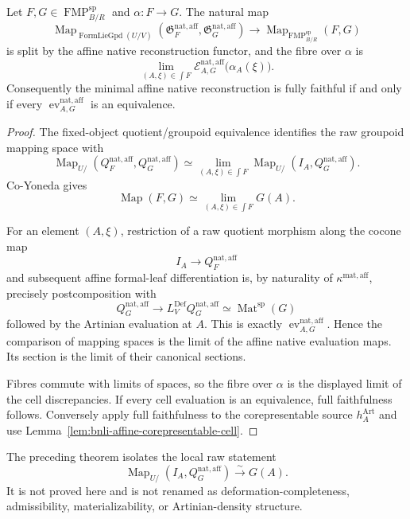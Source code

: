 \begin{theorem}
\label{thm:bnli-affine-mapping-discrepancy}
Let $F,G\in\operatorname{FMP}^{\mathrm{sp}}_{B/R}$ and
$\alpha:F\to G$.  The natural map
\[
    \operatorname{Map}_{\operatorname{FormLieGpd}(U/V)}
    (\mathfrak G_F^{\mathrm{nat,aff}},\mathfrak G_G^{\mathrm{nat,aff}})
    \longrightarrow
    \operatorname{Map}_{\operatorname{FMP}^{\mathrm{sp}}_{B/R}}(F,G)
\]
is split by the affine native reconstruction functor, and the fibre over
$\alpha$ is
\[
\boxed{
    \operatorname*{lim}_{(A,\xi)\in\int F}
    \mathscr E^{\mathrm{nat,aff}}_{A,G}
    \bigl(\alpha_A(\xi)\bigr).}
\]
Consequently the minimal affine native reconstruction is fully faithful if and
only if every $\operatorname{ev}^{\mathrm{nat,aff}}_{A,G}$ is an equivalence.
\end{theorem}

\begin{proof}
The fixed-object quotient/groupoid equivalence identifies the raw groupoid
mapping space with
\[
    \operatorname{Map}_{U/}
    (Q_F^{\mathrm{nat,aff}},Q_G^{\mathrm{nat,aff}})
    \simeq
    \operatorname*{lim}_{(A,\xi)\in\int F}
    \operatorname{Map}_{U/}(I_A,Q_G^{\mathrm{nat,aff}}).
\]
Co-Yoneda gives
\[
    \operatorname{Map}(F,G)
    \simeq
    \operatorname*{lim}_{(A,\xi)\in\int F}G(A).
\]

For an element $(A,\xi)$, restriction of a raw quotient morphism along the
cocone map
\[
    I_A\longrightarrow Q_F^{\mathrm{nat,aff}}
\]
and subsequent affine formal-leaf differentiation is, by naturality of
$\kappa^{\mathrm{mat,aff}}$, precisely postcomposition with
\[
    Q_G^{\mathrm{nat,aff}}
    \longrightarrow
    L_V^{\mathrm{Def}}Q_G^{\mathrm{nat,aff}}
    \simeq
    \operatorname{Mat}^{\mathrm{sp}}(G)
\]
followed by the Artinian evaluation at $A$.  This is exactly
$\operatorname{ev}^{\mathrm{nat,aff}}_{A,G}$.  Hence the comparison of mapping
spaces is the limit of the affine native evaluation maps.  Its section is the
limit of their canonical sections.

Fibres commute with limits of spaces, so the fibre over $\alpha$ is the
displayed limit of the cell discrepancies.  If every cell evaluation is an
equivalence, full faithfulness follows.  Conversely apply full faithfulness
to the corepresentable source $h_A^{\mathrm{Art}}$ and use
Lemma~\ref{lem:bnli-affine-corepresentable-cell}.
\end{proof}

\begin{remark}
The preceding theorem isolates the local raw statement
\[
    \operatorname{Map}_{U/}(I_A,Q_G^{\mathrm{nat,aff}})
    \xrightarrow{\sim}
    G(A).
\]
It is not proved here and is not renamed as deformation-completeness,
admissibility, materializability, or Artinian-density structure.
\end{remark}

